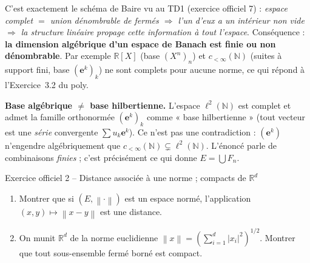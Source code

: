 \documentclass[11pt,a4paper]{article}
\newcommand{\R}{\mathbb{R}}
\newcommand{\N}{\mathbb{N}}
\newcommand{\norm}[1]{\left\|#1\right\|}
\theoremstyle{definition}
\begin{document}
\begin{pointcle}
C'est exactement le schéma de Baire vu au TD1 (exercice officiel 7) : \emph{espace complet $=$ union dénombrable de fermés $\Rightarrow$ l'un d'eux a un intérieur non vide $\Rightarrow$ la structure linéaire propage cette information à tout l'espace}. Conséquence : \textbf{la dimension algébrique d'un espace de Banach est finie ou non dénombrable}. Par exemple $\R[X]$ (base $(X^n)_n$) et $c_{<\infty}(\N)$ (suites à support fini, base $(\mathbf e^k)_k$) ne sont complets pour aucune norme, ce qui répond à l'Exercice~3.2 du poly.
\end{pointcle}

\begin{piege}
\textbf{Base algébrique $\ne$ base hilbertienne.} L'espace $\ell^2(\N)$ est complet et admet la famille orthonormée $(\mathbf e^k)_k$ comme « base hilbertienne » (tout vecteur est une \emph{série} convergente $\sum u_k\mathbf e^k$). Ce n'est pas une contradiction : $(\mathbf e^k)$ n'engendre algébriquement que $c_{<\infty}(\N)\subsetneq\ell^2(\N)$. L'énoncé parle de combinaisons \emph{finies} ; c'est précisément ce qui donne $E=\bigcup F_n$.
\end{piege}

\begin{exo}{Exercice officiel 2 -- Distance associée à une norme ; compacts de $\R^d$}
\begin{enumerate}[label=(\alph*)]
  \item Montrer que si $(E,\norm\cdot)$ est un espace normé, l'application $(x,y)\mapsto\norm{x-y}$ est une distance.
  \item On munit $\R^d$ de la norme euclidienne $\norm x=(\sum_{i=1}^d|x_i|^2)^{1/2}$. Montrer que tout sous-ensemble fermé borné est compact.
\end{enumerate}
\end{exo}
\end{document}
